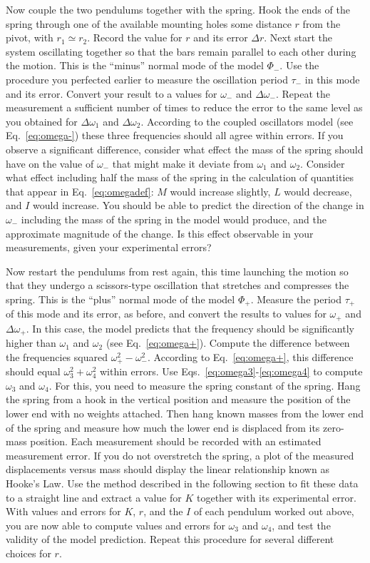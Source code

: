 \documentclass{revtex4}
\begin{document}
Now couple the two pendulums together with the spring. Hook the ends of
the spring through one of the available mounting holes some distance $r$
from the pivot, with $r_1\simeq r_2$.  Record the value for $r$ and its
error $\Delta r$.  Next start the system oscillating together so that 
the bars remain parallel to each other during the motion.  This is the
``minus'' normal mode of the model $\Phi_-$.  Use the procedure you perfected
earlier to measure the oscillation period $\tau_-$ in this mode and its
error.  Convert your result to a values for $\omega_-$ and $\Delta\omega_-$.
Repeat the measurement a sufficient number of times to reduce the error
to the same level as you obtained for $\Delta\omega_1$ and $\Delta\omega_2$.
According to the coupled oscillators model (see Eq.~\ref{eq:omega-}) these
three frequencies should all agree within errors.
If you observe a significant difference, consider
what effect the mass of the spring should have on the value of $\omega_-$
that might make it deviate from $\omega_1$ and $\omega_2$.  Consider what
effect including half the mass of the spring in the calculation of quantities
that appear in Eq.~\ref{eq:omegadef}: $M$ would increase slightly, $L$
would decrease, and $I$ would increase.  You should be able to predict
the direction of the change in $\omega_-$ including the mass of the spring
in the model would produce, and the approximate magnitude of the change.
Is this effect observable in your measurements, given your experimental
errors?

Now restart the pendulums from rest again, this time launching the motion
so that they undergo a scissors-type oscillation that stretches and
compresses the spring.  This is the ``plus'' normal mode of the model
$\Phi_+$.  Measure the period $\tau_+$ of this mode and its error, as
before, and convert the results to values for $\omega_+$ and 
$\Delta\omega_+$.  In this case, the model predicts that the frequency
should be significantly higher than $\omega_1$ and $\omega_2$ (see
Eq.~\ref{eq:omega+}).  Compute the difference between the frequencies
squared $\omega_+^2-\omega_-^2$. According to Eq.~\ref{eq:omega+},
this difference should equal $\omega_3^2+\omega_4^2$ within errors.
Use Eqs.~\ref{eq:omega3}-\ref{eq:omega4} to compute $\omega_3$ and
$\omega_4$.  For this, you need to measure the spring constant of the
spring.  Hang the spring from a hook in the vertical position and measure
the position of the lower end with no weights attached.  Then hang known
masses from the lower end of the spring and measure how much the lower
end is displaced from its zero-mass position.  Each measurement should be
recorded with an estimated measurement error. If you do not overstretch
the spring, a plot of the measured displacements versus mass should
display the linear relationship known as Hooke's Law.  Use the method
described in the following section to fit these data to a straight line
and extract a value for $K$ together with its experimental error.
With values and errors for $K$, $r$, and the $I$ of each pendulum
worked out above, you are now able to compute values and errors for
$\omega_3$ and $\omega_4$, and test the validity of the model prediction.
Repeat this procedure for several different choices for $r$.
\end{document}
